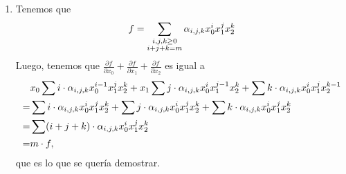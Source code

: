 \begin{sol}
	\begin{enumerate}
		\item Tenemos que
		      $$f = \displaystyle\sum_{\substack{i, j, k \geq 0 \\ i + j + k = m}} \alpha_{i, j, k} x_0^i x_1^jx_2^k$$
		      Luego, tenemos que $\frac{\partial f}{\partial x_0} + \frac{\partial f}{\partial x_1} + \frac{\partial f}{\partial x_2}$ es igual a
		      \begin{align*}
			        & x_0 \displaystyle\sum i \cdot \alpha_{i, j, k} x_0^{i-1} x_1^jx_2^k + x_1 \displaystyle\sum j \cdot \alpha_{i, j, k} x_0^i x_1^{j-1} x_2^k + \displaystyle\sum k \cdot \alpha_{i, j, k} x_0^i x_1^j x_2^{k-1} \\
			      = & \displaystyle\sum i \cdot \alpha_{i, j, k} x_0^i x_1^jx_2^k + \displaystyle\sum j \cdot \alpha_{i, j, k} x_0^i x_1^jx_2^k + \displaystyle\sum k \cdot \alpha_{i, j, k} x_0^i x_1^jx_2^k                       \\
			      = & \displaystyle\sum (i+j+k) \cdot \alpha_{i, j, k} x_0^i x_1^jx_2^k                                                                                                                         \\
			      = & m \cdot f,
		      \end{align*}
		      que es lo que se quería demostrar.


\end{enumerate}
\end{sol}
